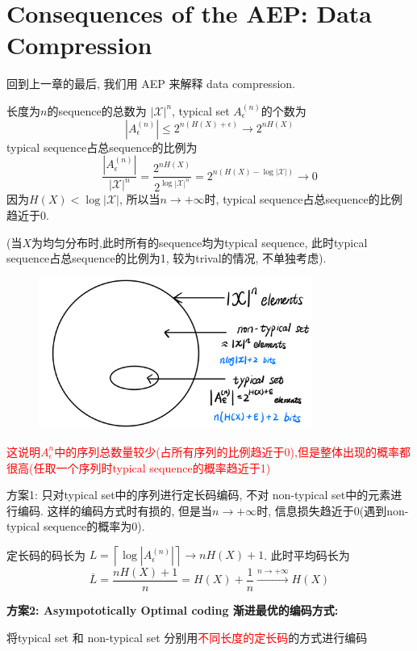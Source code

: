\section{Consequences of the AEP: Data Compression}
回到上一章的最后, 我们用 AEP 来解释 data compression.

长度为$n$的sequence的总数为 $|\mathcal{X}|^n$, typical set $A_{\epsilon}^{(n)}$的个数为
$$\left|A_{\epsilon}^{(n)}\right|\leq 2^{n(H(X)+\epsilon)}\to 2^{nH(X)}$$
typical sequence占总sequence的比例为
$$\dfrac{\left|A_{\epsilon}^{(n)}\right|}{|\mathcal{X}|^n}=\dfrac{2^{nH(X)}}{2^{\log|\mathcal{X}|^n}}=2^{n(H(X)-\log|\mathcal{X}|)}\to 0$$
因为$H(X)<\log|\mathcal{X}|$, 所以当$n\to+\infty$时, typical sequence占总sequence的比例趋近于0.

(当$X$为均匀分布时,此时所有的sequence均为typical sequence, 此时typical sequence占总sequence的比例为1, 较为trival的情况, 不单独考虑).

\begin{figure}[htbp]
    \centering
    \includegraphics[width=0.8\textwidth]{./figures/chapter4/typical_set.png}
\end{figure}

\textcolor{red}{这说明$A_{\epsilon}^{n}$中的序列总数量较少(占所有序列的比例趋近于0),但是整体出现的概率都很高(任取一个序列时typical sequence的概率趋近于1)}

方案1: 只对typical set中的序列进行定长码编码, 不对 non-typical set中的元素进行编码. 这样的编码方式时有损的, 但是当$n\to+\infty$时, 信息损失趋近于0(遇到non-typical sequence的概率为0).

定长码的码长为 $L=\left\lceil\log\left|A_{\epsilon}^{(n)}\right|\right\rceil \to nH(X)+1$.
此时平均码长为
$$\overline{L}=\dfrac{nH(X)+1}{n}=H(X)+\dfrac{1}{n}\stackrel{n\to+\infty}{\to}H(X)$$


\textbf{方案2: Asympototically Optimal coding 渐进最优的编码方式:}

将typical set 和 non-typical set 分别用\textcolor{red}{不同长度的定长码}的方式进行编码

